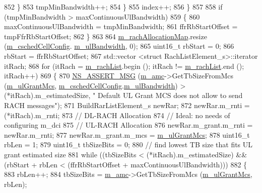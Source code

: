 \begin{DoxyCode}
852             \}
853           tmpMinBandwidth++;
854         \}
855       index++;
856     \}
857 
858   \textcolor{keywordflow}{if} (tmpMinBandwidth > maxContinuousUlBandwidth)
859     \{
860       maxContinuousUlBandwidth = tmpMinBandwidth;
861       ffrRbStartOffset = tmpFfrRbStartOffset;
862     \}
863 
864   \hyperlink{classns3_1_1CqaFfMacScheduler_a813fe1147a11b3b5c34d9a345535a920}{m\_rachAllocationMap}.resize (\hyperlink{classns3_1_1CqaFfMacScheduler_ad5dc768ca3a3c71671fd64de7de8ec00}{m\_cschedCellConfig}.
      \hyperlink{structns3_1_1FfMacCschedSapProvider_1_1CschedCellConfigReqParameters_a5ab5b102878e6e7e7727a14af4a64d2f}{m\_ulBandwidth}, 0);
865   uint16\_t rbStart = 0;
866   rbStart = ffrRbStartOffset;
867   std::vector <struct RachListElement\_s>::iterator itRach;
868   \textcolor{keywordflow}{for} (itRach = \hyperlink{classns3_1_1CqaFfMacScheduler_a8acbb79b06264ecc897614a20f77a3ad}{m\_rachList}.begin (); itRach != \hyperlink{classns3_1_1CqaFfMacScheduler_a8acbb79b06264ecc897614a20f77a3ad}{m\_rachList}.end (); itRach++)
869     \{
870       \hyperlink{assert_8h_aff5ece9066c74e681e74999856f08539}{NS\_ASSERT\_MSG} (\hyperlink{classns3_1_1CqaFfMacScheduler_aa32ec6c7683816a4afdb922f73c0fdc6}{m\_amc}->GetTbSizeFromMcs (\hyperlink{classns3_1_1CqaFfMacScheduler_a6ecc5189910f7224f44baf74d8fa8684}{m\_ulGrantMcs}, 
      \hyperlink{classns3_1_1CqaFfMacScheduler_ad5dc768ca3a3c71671fd64de7de8ec00}{m\_cschedCellConfig}.\hyperlink{structns3_1_1FfMacCschedSapProvider_1_1CschedCellConfigReqParameters_a5ab5b102878e6e7e7727a14af4a64d2f}{m\_ulBandwidth}) > (*itRach).m\_estimatedSize, \textcolor{stringliteral}{" Default UL
       Grant MCS does not allow to send RACH messages"});
871       BuildRarListElement\_s newRar;
872       newRar.m\_rnti = (*itRach).m\_rnti;
873       \textcolor{comment}{// DL-RACH Allocation}
874       \textcolor{comment}{// Ideal: no needs of configuring m\_dci}
875       \textcolor{comment}{// UL-RACH Allocation}
876       newRar.m\_grant.m\_rnti = newRar.m\_rnti;
877       newRar.m\_grant.m\_mcs = \hyperlink{classns3_1_1CqaFfMacScheduler_a6ecc5189910f7224f44baf74d8fa8684}{m\_ulGrantMcs};
878       uint16\_t rbLen = 1;
879       uint16\_t tbSizeBits = 0;
880       \textcolor{comment}{// find lowest TB size that fits UL grant estimated size}
881       \textcolor{keywordflow}{while} ((tbSizeBits < (*itRach).m\_estimatedSize) && (rbStart + rbLen < (ffrRbStartOffset + 
      maxContinuousUlBandwidth)))
882         \{
883           rbLen++;
884           tbSizeBits = \hyperlink{classns3_1_1CqaFfMacScheduler_aa32ec6c7683816a4afdb922f73c0fdc6}{m\_amc}->GetTbSizeFromMcs (\hyperlink{classns3_1_1CqaFfMacScheduler_a6ecc5189910f7224f44baf74d8fa8684}{m\_ulGrantMcs}, rbLen);

\end{DoxyCode}
